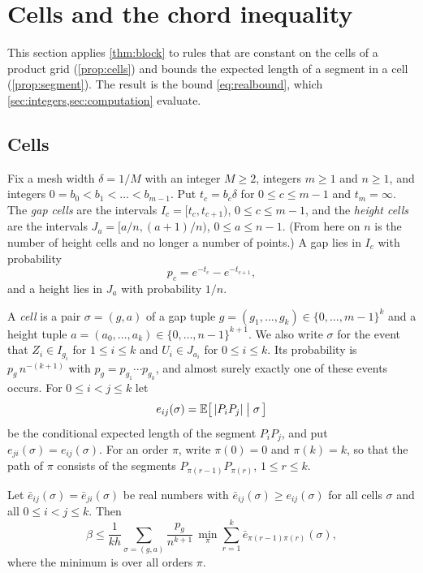 \section{Cells and the chord inequality}\label{sec:cells}

This section applies \cref{thm:block} to rules that are constant on the cells of a product grid (\cref{prop:cells}) and bounds the expected length of a segment in a cell (\cref{prop:segment}). The result is the bound \eqref{eq:realbound}, which \cref{sec:integers,sec:computation} evaluate.

\subsection{Cells}

Fix a mesh width $\delta=1/M$ with an integer $M\ge2$, integers $m\ge1$ and $n\ge1$, and integers $0=b_0<b_1<\dots<b_{m-1}$. Put $t_c=b_c\delta$ for $0\le c\le m-1$ and $t_m=\infty$. The \emph{gap cells} are the intervals $I_c=[t_c,t_{c+1})$, $0\le c\le m-1$, and the \emph{height cells} are the intervals $J_a=[a/n,(a+1)/n)$, $0\le a\le n-1$. (From here on $n$ is the number of height cells and no longer a number of points.) A gap lies in $I_c$ with probability
\[
p_c=e^{-t_c}-e^{-t_{c+1}},
\]
and a height lies in $J_a$ with probability $1/n$.

A \emph{cell} is a pair $\sigma=(g,a)$ of a gap tuple $g=(g_1,\dots,g_k)\in\{0,\dots,m-1\}^k$ and a height tuple $a=(a_0,\dots,a_k)\in\{0,\dots,n-1\}^{k+1}$. We also write $\sigma$ for the event that $Z_i\in I_{g_i}$ for $1\le i\le k$ and $U_i\in J_{a_i}$ for $0\le i\le k$. Its probability is $p_g\,n^{-(k+1)}$ with $p_g=p_{g_1}\cdots p_{g_k}$, and almost surely exactly one of these events occurs. For $0\le i<j\le k$ let
\[
e_{ij}(\sigma)=\mathbb{E}\bigl[\,|P_iP_j|\;\big|\;\sigma\,\bigr]
\]
be the conditional expected length of the segment $P_iP_j$, and put $e_{ji}(\sigma)=e_{ij}(\sigma)$. For an order $\pi$, write $\pi(0)=0$ and $\pi(k)=k$, so that the path of $\pi$ consists of the segments $P_{\pi(r-1)}P_{\pi(r)}$, $1\le r\le k$.

\begin{prop}\label{prop:cells}
Let $\bar e_{ij}(\sigma)=\bar e_{ji}(\sigma)$ be real numbers with $\bar e_{ij}(\sigma)\ge e_{ij}(\sigma)$ for all cells $\sigma$ and all $0\le i<j\le k$. Then
\[
\beta\le\frac{1}{kh}\sum_{\sigma=(g,a)}\frac{p_g}{n^{k+1}}\,\min_\pi\sum_{r=1}^{k}\bar e_{\pi(r-1)\pi(r)}(\sigma),
\]
where the minimum is over all orders $\pi$.
\end{prop}

